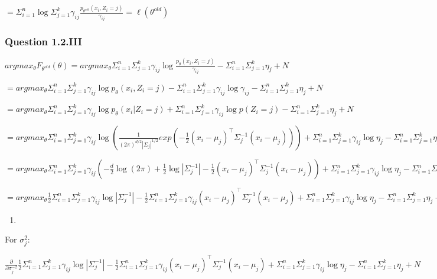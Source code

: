 \documentclass[
]{article}
\providecommand{\tightlist}{%
  \setlength{\itemsep}{0pt}\setlength{\parskip}{0pt}}
\begin{document}
\(= \Sigma_{i=1}^n \log \Sigma_{j=1}^k \gamma_{ij} \frac{p_{\theta^{old}}(x_i, Z_i = j)}{\gamma_{ij}} = \ell(\theta^{old})\)

\hypertarget{question-1.2.iii}{%
\subsubsection{Question 1.2.III}\label{question-1.2.iii}}

\(argmax_\theta F_{\theta^{old}}(\theta) = argmax_\theta \Sigma_{i=1}^n \Sigma_{j=1}^k \gamma_{ij} \log \frac{p_{\theta}(x_i, Z_i = j)}{\gamma_{ij}} - \Sigma_{i=1}^n \Sigma_{j=1}^k \eta_j + N\)

\(= argmax_\theta \Sigma_{i=1}^n \Sigma_{j=1}^k \gamma_{ij} \log p_{\theta}(x_i, Z_i = j) - \Sigma_{i=1}^n \Sigma_{j=1}^k \gamma_{ij} \log \gamma_{ij} - \Sigma_{i=1}^n \Sigma_{j=1}^k \eta_j + N\)

\(= argmax_\theta \Sigma_{i=1}^n \Sigma_{j=1}^k \gamma_{ij} \log p_{\theta}(x_i | Z_i = j) + \Sigma_{i=1}^n \Sigma_{j=1}^k \gamma_{ij} \log p(Z_i = j) - \Sigma_{i=1}^n \Sigma_{j=1}^k \eta_j + N\)

\(= argmax_\theta \Sigma_{i=1}^n \Sigma_{j=1}^k \gamma_{ij} \log (\frac{1}{(2\pi)^{d/2}|\Sigma_j|^{1/2}}exp(-\frac{1}{2}(x_i-\mu_j)^\top \Sigma_j^{-1}(x_i-\mu_j))) + \Sigma_{i=1}^n \Sigma_{j=1}^k \gamma_{ij} \log \eta_j - \Sigma_{i=1}^n \Sigma_{j=1}^k \eta_j + N\)

\(= argmax_\theta \Sigma_{i=1}^n \Sigma_{j=1}^k \gamma_{ij} (- \frac{d}{2}\log (2\pi) + \frac{1}{2} \log |\Sigma_j^{-1}|-\frac{1}{2}(x_i-\mu_j)^\top \Sigma_j^{-1}(x_i-\mu_j)) + \Sigma_{i=1}^n \Sigma_{j=1}^k \gamma_{ij} \log \eta_j - \Sigma_{i=1}^n \Sigma_{j=1}^k \eta_j + N\)

\(= argmax_\theta \frac{1}{2}\Sigma_{i=1}^n \Sigma_{j=1}^k \gamma_{ij} \log |\Sigma_j^{-1}|-\frac{1}{2}\Sigma_{i=1}^n \Sigma_{j=1}^k \gamma_{ij}(x_i-\mu_j)^\top \Sigma_j^{-1}(x_i-\mu_j) + \Sigma_{i=1}^n \Sigma_{j=1}^k \gamma_{ij} \log \eta_j - \Sigma_{i=1}^n \Sigma_{j=1}^k \eta_j + N\)

\begin{enumerate}
\def\labelenumi{\alph{enumi})}
\setcounter{enumi}{4}
\tightlist
\item
\end{enumerate}

For \(\sigma^2_j:\)

\(\frac{\partial}{\partial \sigma^{-2}_j}\frac{1}{2}\Sigma_{i=1}^n \Sigma_{j=1}^k \gamma_{ij} \log |\Sigma_j^{-1}|-\frac{1}{2}\Sigma_{i=1}^n \Sigma_{j=1}^k \gamma_{ij}(x_i-\mu_j)^\top \Sigma_j^{-1}(x_i-\mu_j) + \Sigma_{i=1}^n \Sigma_{j=1}^k \gamma_{ij} \log \eta_j - \Sigma_{i=1}^n \Sigma_{j=1}^k \eta_j + N\)
\end{document}
